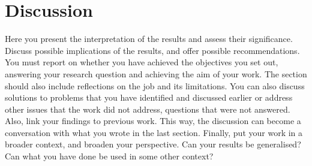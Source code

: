 \section{Discussion}

Here you present the interpretation of the results and assess their significance. Discuss possible implications of the results, and offer possible recommendations. You must report on whether you have achieved the objectives you set out, answering your research question and achieving the aim of your work. The section should also include reflections on the job and its limitations.  You can also discuss solutions to problems that you have identified and discussed earlier or address other issues that the work did not address, questions that were not answered. Also, link your findings to previous work. This way, the discussion can become a conversation with what you wrote in the last section.  Finally, put your work in a broader context, and broaden your perspective. Can your results be generalised? Can what you have done be used in some other context? 